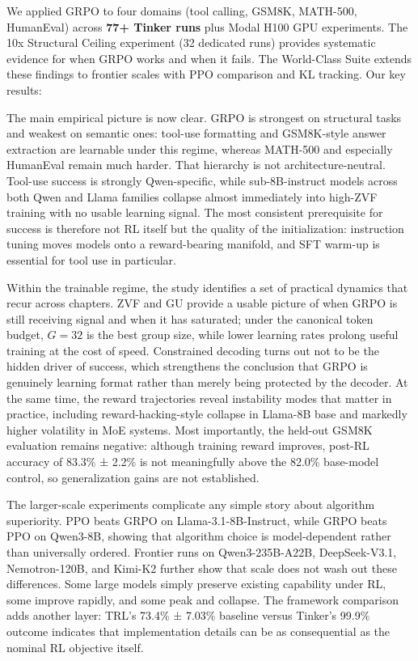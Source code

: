\documentclass[
  american,
  11pt,
  a4paper,
  oneside]{report}
\begin{document}
We applied GRPO to four domains (tool calling, GSM8K, MATH-500,
HumanEval) across \textbf{77+ Tinker runs} plus Modal H100 GPU
experiments. The 10x Structural Ceiling experiment (32 dedicated runs)
provides systematic evidence for when GRPO works and when it fails. The
World-Class Suite extends these findings to frontier scales with PPO
comparison and KL tracking. Our key results:

The main empirical picture is now clear. GRPO is strongest on structural
tasks and weakest on semantic ones: tool-use formatting and GSM8K-style
answer extraction are learnable under this regime, whereas MATH-500 and
especially HumanEval remain much harder. That hierarchy is not
architecture-neutral. Tool-use success is strongly Qwen-specific, while
sub-8B-instruct models across both Qwen and Llama families collapse
almost immediately into high-ZVF training with no usable learning
signal. The most consistent prerequisite for success is therefore not RL
itself but the quality of the initialization: instruction tuning moves
models onto a reward-bearing manifold, and SFT warm-up is essential for
tool use in particular.

Within the trainable regime, the study identifies a set of practical
dynamics that recur across chapters. ZVF and GU provide a usable picture
of when GRPO is still receiving signal and when it has saturated; under
the canonical token budget, \(G{=}32\) is the best group size, while
lower learning rates prolong useful training at the cost of speed.
Constrained decoding turns out not to be the hidden driver of success,
which strengthens the conclusion that GRPO is genuinely learning format
rather than merely being protected by the decoder. At the same time, the
reward trajectories reveal instability modes that matter in practice,
including reward-hacking-style collapse in Llama-8B base and markedly
higher volatility in MoE systems. Most importantly, the held-out GSM8K
evaluation remains negative: although training reward improves, post-RL
accuracy of 83.3\% ± 2.2\% is not meaningfully above the 82.0\%
base-model control, so generalization gains are not established.

The larger-scale experiments complicate any simple story about algorithm
superiority. PPO beats GRPO on Llama-3.1-8B-Instruct, while GRPO beats
PPO on Qwen3-8B, showing that algorithm choice is model-dependent rather
than universally ordered. Frontier runs on Qwen3-235B-A22B,
DeepSeek-V3.1, Nemotron-120B, and Kimi-K2 further show that scale does
not wash out these differences. Some large models simply preserve
existing capability under RL, some improve rapidly, and some peak and
collapse. The framework comparison adds another layer: TRL's 73.4\% ±
7.03\% baseline versus Tinker's 99.9\% outcome indicates that
implementation details can be as consequential as the nominal RL
objective itself.
\end{document}
